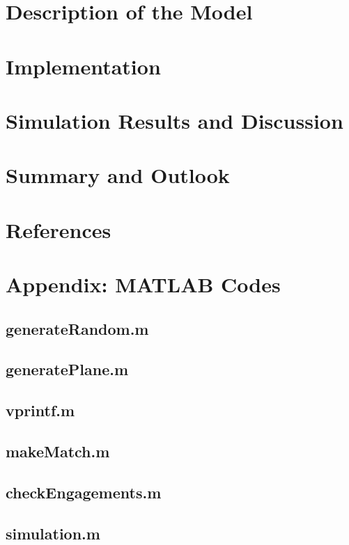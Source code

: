 \documentclass[11pt]{article}
\begin{document}
\section{Description of the Model}

\citet{1962} %

\section{Implementation}

\section{Simulation Results and Discussion}

\section{Summary and Outlook}

\section{References}





\section{Appendix: MATLAB Codes}

\subsection*{generateRandom.m}

\subsection*{generatePlane.m}

\subsection*{vprintf.m}

\subsection*{makeMatch.m}

\subsection*{checkEngagements.m}

\subsection*{simulation.m}

\end{document}
